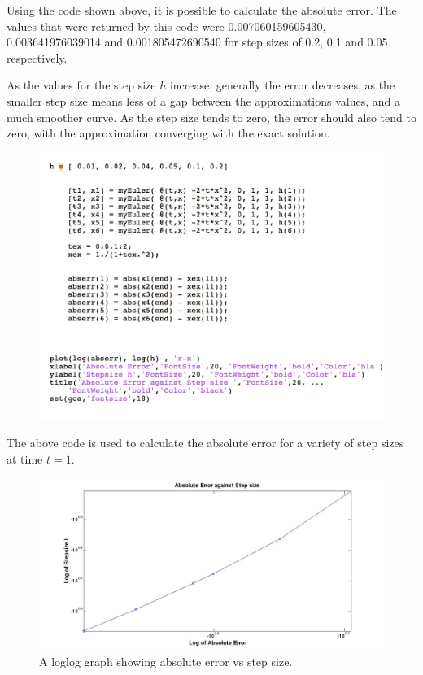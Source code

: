 \documentclass[a4paper]{article}
\begin{document}
Using the code shown above, it is possible to calculate the absolute error. The values that were returned by this code were 0.007060159605430, 0.003641976039014 and 0.001805472690540 for step sizes of 0.2, 0.1 and 0.05 respectively. 


As the values for the step size $h$ increase, generally the error decreases, as the smaller step size means less of a gap between the approximations values, and a much smoother curve. As the step size tends to zero, the error should also tend to zero, with the approximation converging with the exact solution.


\begin{figure}[H]
\includegraphics[width=1\textwidth]{ploterrorcode.jpg}
\end{figure}

The above code is used to calculate the absolute error for a variety of step sizes at time $t = 1$. 


\begin{figure}[H]
\centering
\includegraphics[width=1\textwidth]{question1errorstepsize.jpg}
\caption{\label{fig:question1errorstepsize}A loglog graph showing absolute error vs step size. }
\end{figure}
\end{document}
